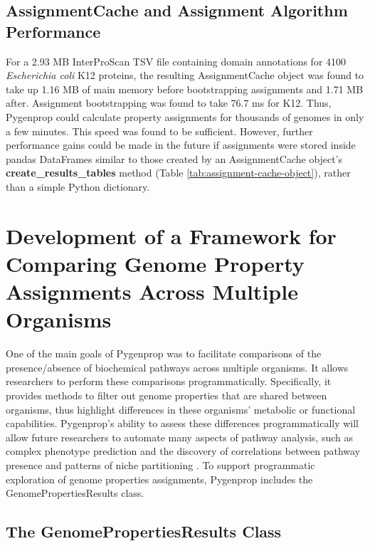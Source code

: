 \subsection{AssignmentCache and Assignment Algorithm Performance} \label{AssignmentCache-Performance}

For a 2.93 MB InterProScan TSV file containing domain annotations for 4100 \textit{Escherichia coli} K12 proteins, the resulting AssignmentCache object was found to take up 1.16 MB of main memory before bootstrapping assignments and 1.71 MB after. Assignment bootstrapping was found to take 76.7  ms for K12. Thus, Pygenprop could calculate property assignments for thousands of genomes in only a few minutes. This speed was found to be sufficient. However, further performance gains could be made in the future if assignments were stored inside pandas DataFrames \cite{mckinney2010data} similar to those created by an AssignmentCache object's \textbf{create\_results\_tables} method (Table \ref{tab:assignment-cache-object}), rather than a simple Python dictionary.

\section{Development of a Framework for Comparing Genome Property Assignments Across Multiple Organisms} \label{GenomePropertiesResults}

One of the main goals of Pygenprop was to facilitate comparisons of the presence/absence of biochemical pathways across multiple organisms. It allows researchers to perform these comparisons programmatically. Specifically, it provides methods to filter out genome properties that are shared between organisms, thus highlight differences in these organisms' metabolic or functional capabilities. Pygenprop's ability to assess these differences programmatically will allow future researchers to automate many aspects of pathway analysis, such as complex phenotype prediction and the discovery of correlations between pathway presence and patterns of niche partitioning \cite{finke2008niche}. To support programmatic exploration of genome properties assignments, Pygenprop includes the GenomePropertiesResults class. 

\subsection{The GenomePropertiesResults Class}

